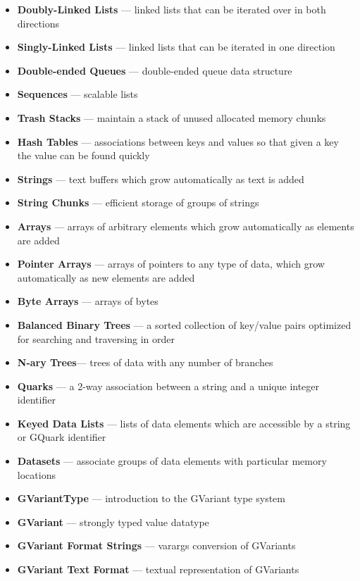 \documentclass[12pt]{article}
\begin{document}
\begin{itemize}
\begin{itemize}
\item \textbf{Doubly-Linked Lists} — linked lists that can be iterated over in both directions
\item \textbf{Singly-Linked Lists} — linked lists that can be iterated in one direction
\item \textbf{Double-ended Queues} — double-ended queue data structure
\item \textbf{Sequences} — scalable lists
\item \textbf{Trash Stacks} — maintain a stack of unused allocated memory chunks
\item \textbf{Hash Tables} — associations between keys and values so that given a key the value can be found quickly
\item \textbf{Strings} — text buffers which grow automatically as text is added
\item \textbf{String Chunks} — efficient storage of groups of strings
\item \textbf{Arrays} — arrays of arbitrary elements which grow automatically as elements are added
\item \textbf{Pointer Arrays} — arrays of pointers to any type of data, which grow automatically as new elements are added
\item \textbf{Byte Arrays} — arrays of bytes
\item \textbf{Balanced Binary Trees} — a sorted collection of key/value pairs optimized for searching and traversing in order
\item \textbf{N-ary Trees}— trees of data with any number of branches
\item \textbf{Quarks} — a 2-way association between a string and a unique integer identifier
\item \textbf{Keyed Data Lists} — lists of data elements which are accessible by a string or GQuark identifier
\item \textbf{Datasets} — associate groups of data elements with particular memory locations
\item \textbf{GVariantType} — introduction to the GVariant type system
\item \textbf{GVariant} — strongly typed value datatype
\item \textbf{GVariant Format Strings} — varargs conversion of GVariants
\item \textbf{GVariant Text Format} — textual representation of GVariants






\end{itemize}
\end{itemize}
\end{document}

